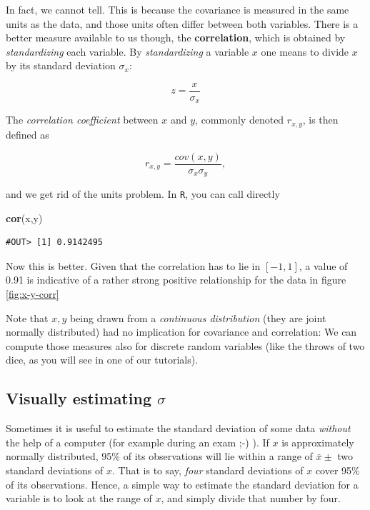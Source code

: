 \documentclass[]{book}
\newenvironment{Shaded}{\begin{snugshade}}{\end{snugshade}}
\newcommand{\KeywordTok}[1]{\textcolor[rgb]{0.13,0.29,0.53}{\textbf{#1}}}
\newcommand{\NormalTok}[1]{#1}
\begin{document}
In fact, we cannot tell. This is because the covariance is measured in
the same units as the data, and those units often differ between both
variables. There is a better measure available to us though, the
\textbf{correlation}, which is obtained by \emph{standardizing} each
variable. By \emph{standardizing} a variable \(x\) one means to divide
\(x\) by its standard deviation \(\sigma_x\):

\[
z = \frac{x}{\sigma_x}
\]

The \emph{correlation coefficient} between \(x\) and \(y\), commonly
denoted \(r_{x,y}\), is then defined as

\[
r_{x,y} = \frac{cov(x,y)}{\sigma_x \sigma_y},
\]

and we get rid of the units problem. In \texttt{R}, you can call
directly

\begin{Shaded}
\begin{Highlighting}[]
\KeywordTok{cor}\NormalTok{(x,y)}
\end{Highlighting}
\end{Shaded}

\begin{verbatim}
#OUT> [1] 0.9142495
\end{verbatim}

Now this is better. Given that the correlation has to lie in \([-1,1]\),
a value of 0.91 is indicative of a rather strong positive relationship
for the data in figure \ref{fig:x-y-corr}

Note that \(x,y\) being drawn from a \emph{continuous distribution}
(they are joint normally distributed) had no implication for covariance
and correlation: We can compute those measures also for discrete random
variables (like the throws of two dice, as you will see in one of our
tutorials).

\subsection{\texorpdfstring{Visually estimating
\(\sigma\)}{Visually estimating \textbackslash{}sigma}}\label{visually-estimating-sigma}

Sometimes it is useful to estimate the standard deviation of some data
\emph{without} the help of a computer (for example during an exam ;-) ).
If \(x\) is approximately normally distributed, 95\% of its observations
will lie within a range of \(\bar{x}\pm\) two standard deviations of
\(x\). That is to say, \emph{four} standard deviations of \(x\) cover
95\% of its observations. Hence, a simple way to estimate the standard
deviation for a variable is to look at the range of \(x\), and simply
divide that number by four.
\end{document}
